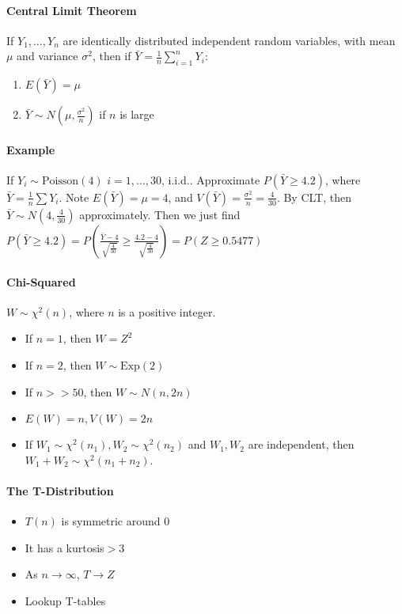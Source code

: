 \documentclass[10pt,letter]{article}
\theoremstyle{plain}
\theoremstyle{definition}
\begin{document}
\paragraph{Central Limit Theorem}
If $Y_1,\ldots,Y_n$ are identically distributed independent random variables, with mean $\mu$ and variance $\sigma^2$, then if $\bar{Y}=\frac{1}{n}\sum_{i=1}^n Y_i$:
\begin{enumerate}
    \item $E(\bar{Y})=\mu$ 
    \item $\bar{Y}\sim N\left(\mu,\frac{\sigma^2}{n}\right)$ if $n$ is large
\end{enumerate}
\paragraph{Example}
If $Y_i\sim \text{Poisson}(4)$ $i=1,\ldots,30$, i.i.d.. Approximate $P(\bar{Y}\geq4.2)$, where $\bar{Y}=\frac{1}{n}\sum Y_i$. Note $E(\bar{Y})=\mu=4$, and $V(\bar{Y})=\frac{\sigma^2}{n}=\frac{4}{30}$. By CLT, then $\bar{Y}\sim N(4,\frac{4}{30})$ approximately. Then we just find $P(\bar{Y}\geq4.2)=P\left(\frac{\bar{Y}-4}{\sqrt{\frac{4}{30}}}\geq\frac{4.2-4}{\sqrt{\frac{4}{30}}}\right)=P(Z\geq0.5477)$
\paragraph{Chi-Squared}
$W\sim \chi^2(n)$, where $n$ is a positive integer. \begin{itemize}
    \item If $n=1$, then $W=Z^2$ 
    \item If $n=2$, then $W\sim\text{Exp}(2)$ 
    \item If $n>>50$, then $W\sim N(n,2n)$ 
    \item $E(W)=n,V(W)=2n$ 
    \item If $W_1\sim\chi^2(n_1),W_2\sim\chi^2(n_2)$ and $W_1,W_2$ are independent, then $W_1+W_2\sim\chi^2(n_1+n_2)$. 
\end{itemize}
\paragraph{The T-Distribution}
\begin{itemize}
    \item $T(n)$ is symmetric around $0$ 
    \item It has a kurtosis$>3$ 
    \item As $n\rightarrow\infty$, $T\rightarrow Z$ 
    \item Lookup T-tables
\end{itemize}
\end{document}
